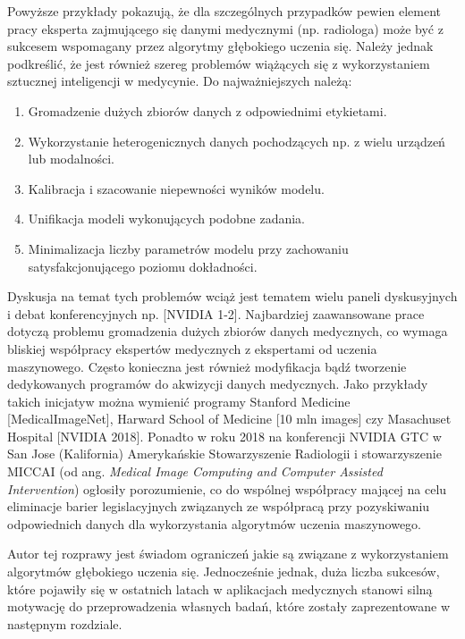 Powyższe przykłady pokazują, że dla szczególnych przypadków pewien element pracy eksperta zajmującego się danymi medycznymi (np. radiologa) może być z sukcesem wspomagany przez algorytmy głębokiego uczenia się. Należy jednak podkreślić, że jest również szereg problemów wiążących się z wykorzystaniem sztucznej inteligencji w medycynie. Do najważniejszych należą:
\begin{enumerate}
	\item Gromadzenie dużych zbiorów danych z odpowiednimi etykietami.
	\item Wykorzystanie heterogenicznych danych pochodzących np. z wielu urządzeń lub modalności.
	\item Kalibracja i szacowanie niepewności wyników modelu.
	\item Unifikacja modeli wykonujących podobne zadania.
	\item Minimalizacja liczby parametrów modelu przy zachowaniu satysfakcjonującego poziomu dokładności.
\end{enumerate}

Dyskusja na temat tych problemów wciąż jest tematem wielu paneli dyskusyjnych i debat konferencyjnych np. [NVIDIA 1-2]. Najbardziej zaawansowane prace dotyczą problemu gromadzenia dużych zbiorów danych medycznych, co wymaga bliskiej współpracy ekspertów medycznych z ekspertami od uczenia maszynowego. Często konieczna jest również modyfikacja bądź tworzenie dedykowanych programów do akwizycji danych medycznych. Jako przykłady takich inicjatyw można wymienić programy Stanford Medicine [MedicalImageNet], Harward School of Medicine [10 mln images] czy Masachuset Hospital [NVIDIA 2018]. Ponadto w roku 2018 na konferencji NVIDIA GTC w San Jose (Kalifornia) Amerykańskie Stowarzyszenie Radiologii i stowarzyszenie MICCAI (od ang. \textit{Medical Image Computing and Computer Assisted Intervention}) ogłosiły porozumienie, co do wspólnej współpracy mającej na celu eliminacje barier legislacyjnych związanych ze współpracą przy pozyskiwaniu odpowiednich danych dla wykorzystania algorytmów uczenia maszynowego.

Autor tej rozprawy jest świadom ograniczeń jakie są związane z wykorzystaniem algorytmów głębokiego uczenia się. Jednocześnie jednak, duża liczba sukcesów, które pojawiły się w ostatnich latach w aplikacjach medycznych stanowi silną motywację do przeprowadzenia własnych badań, które zostały zaprezentowane w następnym rozdziale.


    
